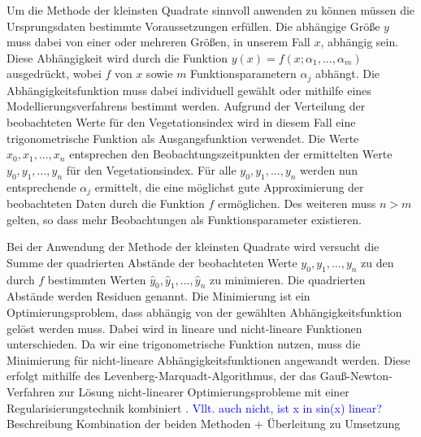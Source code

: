Um die Methode der kleinsten Quadrate sinnvoll anwenden zu können müssen die Ursprungsdaten bestimmte Voraussetzungen erfüllen. Die abhängige Größe \(y\) muss dabei von einer oder mehreren Größen, in unserem Fall \(x\), abhängig sein. Diese Abhängigkeit wird durch die Funktion \(y(x) = f(x;\alpha_1,\dots,\alpha_m)\) ausgedrückt, wobei \(f\) von \(x\) sowie \(m\) Funktionsparametern \(\alpha_j\) abhängt. Die Abhängigkeitsfunktion muss dabei individuell gewählt oder mithilfe eines Modellierungsverfahrens bestimmt werden. Aufgrund der Verteilung der beobachteten Werte für den Vegetationsindex wird in diesem Fall eine trigonometrische Funktion als Ausgangsfunktion verwendet. Die Werte \(x_0, x_1,...,x_n\) entsprechen den Beobachtungszeitpunkten der ermittelten Werte \(y_0, y_1,...,y_n\) für den Vegetationsindex. Für alle \(y_0, y_1,...,y_n\) werden nun entsprechende \(\alpha_j\) ermittelt, die eine möglichst gute Approximierung der beobachteten Daten durch die Funktion \(f\) ermöglichen. Des weiteren muss \(n > m\) gelten, so dass mehr Beobachtungen als Funktionsparameter existieren. 

Bei der Anwendung der Methode der kleinsten Quadrate wird versucht die Summe der quadrierten Abstände der beobachteten Werte \(y_0, y_1,...,y_n\) zu den durch \(f\) bestimmten Werten \(\hat{y}_0, \hat{y}_1,...,\hat{y}_n\) zu minimieren. Die quadrierten Abstände werden Residuen genannt. Die Minimierung ist ein Optimierungsproblem, dass abhängig von der gewählten Abhängigkeitsfunktion gelöst werden muss. Dabei wird in lineare und nicht-lineare Funktionen unterschieden. Da wir eine trigonometrische Funktion nutzen, muss die Minimierung für nicht-lineare Abhängigkeitsfunktionen angewandt werden. Diese erfolgt mithilfe des Levenberg-Marquadt-Algorithmus, der das Gauß-Newton-Verfahren zur Lösung nicht-linearer Optimierungsprobleme mit einer Regularisierungstechnik kombiniert \cite{Levenberg1978}. \textcolor{blue}{Vllt. auch nicht, ist x in sin(x) linear?} \\

Beschreibung Kombination der beiden Methoden + Überleitung zu Umsetzung


